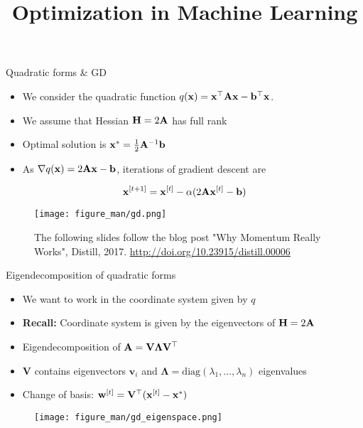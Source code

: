 \documentclass[11pt,compress,t,notes=noshow, xcolor=table]{beamer}
\title{Optimization in Machine Learning}
\date{}
\begin{document}
\lecture{\inserttitle}
\sloppy

\begin{vbframe}{Quadratic forms \& GD}

\begin{itemize}
	\item We consider the quadratic function $q(\mathbf{x}) = \mathbf{x}^\top \mathbf{A} \mathbf{x} - \mathbf{b}^\top \mathbf{x}$. 
	\item We assume that Hessian $\mathbf{H} = 2 \mathbf{A}$ has full rank
	\item Optimal solution is $\mathbf{x}^\ast = \frac{1}{2} \mathbf{A}^{-1} \mathbf{b}$ 
	\item As $\nabla q(\mathbf{x}) = 2 \mathbf{A} \mathbf{x} - \mathbf{b}$, iterations of gradient descent are
\end{itemize}

\vspace{-0.5\baselineskip}

\begin{equation*}
    \mathbf{x}^{[t+1]} = \mathbf{x}^{[t]} - \alpha (2 \mathbf{A} \mathbf{x}^{[t]} - \mathbf{b})
\end{equation*}

\vspace{-\baselineskip}

\begin{figure}
	\texttt{[image: figure\_man/gd.png]}
    \caption*{\centering \footnotesize
        The following slides follow the blog post "Why Momentum Really Works", Distill, 2017.
        \url{http://doi.org/10.23915/distill.00006}}
\end{figure}

\end{vbframe}

\begin{vbframe}{Eigendecomposition of quadratic forms}

\begin{itemize}
    \setlength{\itemsep}{0.5em}
    \item We want to work in the coordinate system given by $q$
    \item \textbf{Recall:} Coordinate system is given by the eigenvectors of $\mathbf{H} = 2\mathbf{A}$
    \item Eigendecomposition of $\mathbf{A} = \mathbf{V} \bm{\Lambda} \mathbf{V}^\top$
    \item $\mathbf{V}$ contains eigenvectors $\mathbf{v}_i$ and $\bm{\Lambda} = \text{diag}(\lambda_1, ..., \lambda_n)$ eigenvalues
    \item Change of basis: $\mathbf{w}^{[t]} = \mathbf{V}^\top (\mathbf{x}^{[t]} - \mathbf{x}^\ast)$
\end{itemize}

\begin{figure}
	\texttt{[image: figure\_man/gd\_eigenspace.png]} \\
\end{figure}

\end{vbframe}
\end{document}
